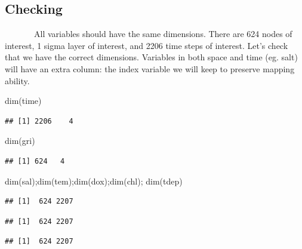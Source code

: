 \documentclass[
]{article}
\newenvironment{Shaded}{\begin{snugshade}}{\end{snugshade}}
\newcommand{\FunctionTok}[1]{\textcolor[rgb]{0.00,0.00,0.00}{#1}}
\newcommand{\NormalTok}[1]{#1}
\begin{document}
\onehalfspacing

\hypertarget{checking}{%
\subsection{Checking}\label{checking}}

~~~~~~~All variables should have the same dimensions. There are 624
nodes of interest, 1 sigma layer of interest, and 2206 time steps of
interest. Let's check that we have the correct dimensions. Variables in
both space and time (eg. salt) will have an extra column: the index
variable we will keep to preserve mapping ability.

\singlespacing

\begin{Shaded}
\begin{Highlighting}[]
\FunctionTok{dim}\NormalTok{(time)}
\end{Highlighting}
\end{Shaded}

\begin{verbatim}
## [1] 2206    4
\end{verbatim}

\begin{Shaded}
\begin{Highlighting}[]
\FunctionTok{dim}\NormalTok{(gri)}
\end{Highlighting}
\end{Shaded}

\begin{verbatim}
## [1] 624   4
\end{verbatim}

\begin{Shaded}
\begin{Highlighting}[]
\FunctionTok{dim}\NormalTok{(sal);}\FunctionTok{dim}\NormalTok{(tem);}\FunctionTok{dim}\NormalTok{(dox);}\FunctionTok{dim}\NormalTok{(chl); }\FunctionTok{dim}\NormalTok{(tdep)}
\end{Highlighting}
\end{Shaded}

\begin{verbatim}
## [1]  624 2207
\end{verbatim}

\begin{verbatim}
## [1]  624 2207
\end{verbatim}

\begin{verbatim}
## [1]  624 2207
\end{verbatim}
\end{document}
